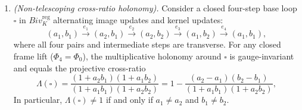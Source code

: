 \begin{theorem}
\begin{enumerate}
  \item \emph{(Non-telescoping cross-ratio holonomy).} Consider a closed four-step
  base loop $\square$ in $Biv_K^{\mathrm{reg}}$ alternating image updates and kernel
  updates:
  \[
    (a_1,b_1) \xrightarrow{e_1} (a_2,b_1) \xrightarrow{e_2} (a_2,b_2)
    \xrightarrow{e_3} (a_1,b_2) \xrightarrow{e_4} (a_1,b_1),
  \]
  where all four pairs and intermediate steps are transverse. For any closed frame
  lift ($\Phi_4=\Phi_0$), the multiplicative holonomy around $\square$ is
  gauge-invariant and equals the projective cross-ratio
  \begin{equation}\label{eq:cross-ratio-holonomy}
    \Lambda(\square)
    = \frac{(1+a_2 b_1)(1+a_1 b_2)}{(1+a_1 b_1)(1+a_2 b_2)}
    = 1 - \frac{(a_2-a_1)(b_2-b_1)}{(1+a_1 b_1)(1+a_2 b_2)},
  \end{equation}
  In particular, $\Lambda(\square)\neq 1$ if and only if $a_1\neq a_2$ and $b_1\neq b_2$.
\end{enumerate}
\end{theorem}

